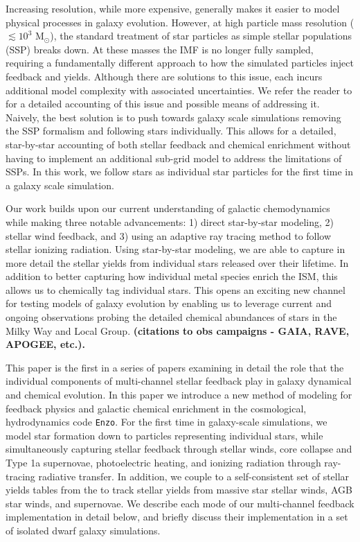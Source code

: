\documentclass[twocolumn]{aastex61}
\begin{document}
Increasing resolution, while more expensive, generally makes it easier to model physical processes in galaxy evolution. However, at high particle mass resolution ($\lesssim 10^3$ M$_{\odot}$), the standard treatment of star particles as simple stellar populations (SSP) breaks down. At these masses the IMF is no longer fully sampled, requiring a fundamentally different approach to how the simulated particles inject feedback and yields. Although there are solutions to this issue, each incurs additional model complexity with associated uncertainties. We refer the reader to \cite{Revaz2016} for a detailed accounting of this issue and possible means of addressing it. Naively, the best solution is to push towards galaxy scale simulations removing the SSP formalism and following stars individually. This allows for a detailed, star-by-star accounting of both stellar feedback and chemical enrichment without having to implement an additional sub-grid model to address the limitations of SSPs. In this work, we follow stars as individual star particles for the first time in a galaxy scale simulation.

Our work builds upon our current understanding of galactic chemodynamics while making three notable advancements: 1) direct star-by-star modeling, 2) stellar wind feedback, and 3) using an adaptive ray tracing method to follow stellar ionizing radiation. Using star-by-star modeling, we are able to capture in more detail the stellar yields from individual stars released over their lifetime. In addition to better capturing how individual metal species enrich the ISM, this allows us to chemically tag individual stars. This opens an exciting new channel for testing models of galaxy evolution by enabling us to leverage current and ongoing observations probing the detailed chemical abundances of stars in the Milky Way and Local Group. \textbf{(citations to obs campaigns - GAIA, RAVE, APOGEE, etc.).}

This paper is the first in a series of papers examining in detail the role that the individual components of multi-channel stellar feedback play in galaxy dynamical and chemical evolution. In this paper we introduce a new method of modeling for feedback physics and galactic chemical enrichment in the cosmological, hydrodynamics code \texttt{Enzo}. For the first time in galaxy-scale simulations, we model star formation down to particles representing individual stars, while simultaneously capturing stellar feedback through stellar winds, core collapse and Type 1a supernovae, photoelectric heating, and ionizing radiation through ray-tracing radiative transfer. In addition, we couple to a self-consistent set of stellar yields tables from the to track stellar yields from massive star stellar winds, AGB star winds, and supernovae. We describe each mode of our multi-channel feedback implementation in detail below, and briefly discuss their implementation in a set of isolated dwarf galaxy simulations.
\end{document}
